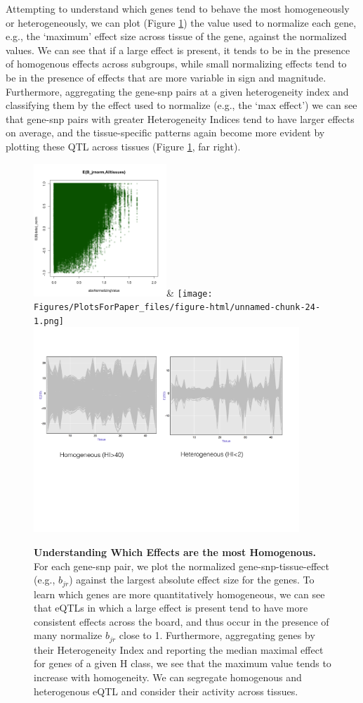 Attempting to understand which genes tend to behave the most homogeneously or heterogeneously, we can plot (Figure \ref{fig:biplot}) the value used to normalize each gene, e.g., the `maximum' effect size across tissue of the gene, against the normalized values. We can see that if a large effect is present, it tends to be in the presence of homogenous effects across subgroups, while small normalizing effects tend to be in the presence of effects that are more variable in sign and magnitude. Furthermore, aggregating the gene-snp pairs at a given heterogeneity index and classifying them by the effect used to normalize (e.g., the `max effect') we can see that gene-snp pairs with greater Heterogeneity Indices tend to have larger effects on average, and the tissue-specific patterns again become more evident by plotting these QTL across tissues (Figure \ref{fig:biplot}, far right).
\begin{figure}[htbp]
\includegraphics[width=5cm]{Figures/normstuffeb_alltissues.png}&
\texttt{[image: Figures/PlotsForPaper\_files/figure-html/unnamed-chunk-24-1.png]}\\
\includegraphics[width=10cm]{Figures/hetvshomqtl.pdf}
\caption{\textbf{Understanding Which Effects are the most Homogenous.} For each gene-snp pair, we plot the normalized gene-snp-tissue-effect (e.g., $b_{jr}$) against the largest absolute effect size for the genes. To learn which genes are more quantitatively homogeneous, we can see that eQTLs in which a large effect is present tend to have more consistent effects across the board, and thus occur in the presence of many normalize $b_{jr}$ close to 1. Furthermore, aggregating genes by their Heterogeneity Index and reporting the median maximal effect for genes of a given H class, we see that the maximum value tends to increase with homogeneity. We can segregate homogenous and heterogenous eQTL and consider their activity across tissues.}
\label{fig:biplot}
\end{figure}


